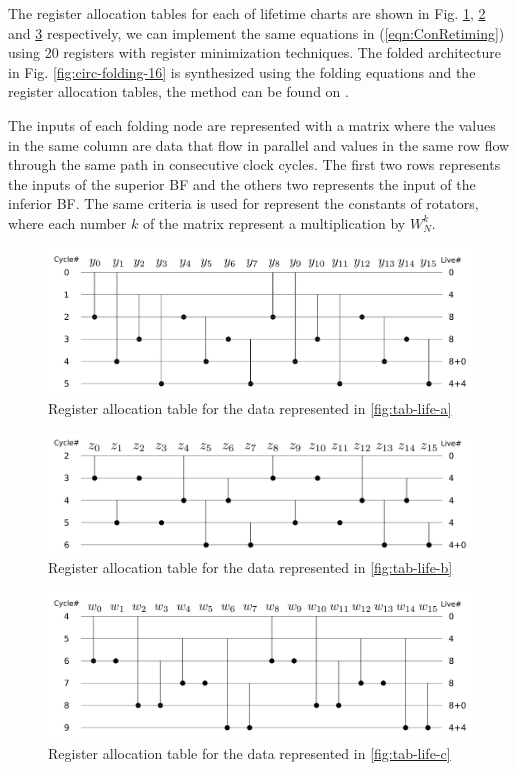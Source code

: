 \documentclass[journal,comsoc]{IEEEtran}
\begin{document}
The register allocation tables for each of lifetime charts are shown in Fig. \ref{fig:tab-aloc-a}, \ref{fig:tab-aloc-b} and \ref{fig:tab-aloc-c} respectively, we can implement the same equations in (\ref{eqn:ConRetiming}) using 20 registers with register minimization techniques. The folded architecture in Fig. \ref{fig:circ-folding-16} is synthesized using the folding equations and the register allocation tables, the method can be found on \cite{folding_parhi_book}. 

The inputs of each folding node are represented with a matrix where the values in the same column are data that flow in parallel and values in the same row flow through the same path in consecutive clock cycles. The first two rows represents the inputs of the superior BF and the others two represents the input of the inferior BF. 
The same criteria is used for represent the constants of rotators, where each number $k$ of the matrix represent a multiplication by $W^k_N$.
\begin{figure}[!t]
\centering
 \includegraphics[width=0.95\linewidth]{Diagramas/life_chart_a.png}
\caption{Register allocation table for the data represented in \ref{fig:tab-life-a}}
\label{fig:tab-aloc-a}
\end{figure}
\begin{figure}[!t]
\centering
 \includegraphics[width=0.95\linewidth]{Diagramas/life_chart_b.png}
\caption{Register allocation table for the data represented in \ref{fig:tab-life-b}}
\label{fig:tab-aloc-b}
\end{figure}
\begin{figure}[!t]
\centering
 \includegraphics[width=0.95\linewidth]{Diagramas/life_chart_c.png}
\caption{Register allocation table for the data represented in \ref{fig:tab-life-c}}
\label{fig:tab-aloc-c}
\end{figure}
\end{document}
